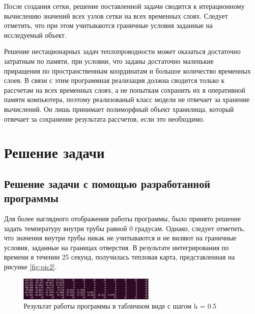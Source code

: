 \documentclass[12pt, a4paper]{article}
\begin{document}
	После создания сетки, решение поставленной задачи сводится к итерационному вычислению значений всех узлов сетки на всех временных слоях. Следует отметить, что при этом учитываются граничные условия заданные на исследуемый объект.
	
	Решение нестационарных задач теплопроводности может оказаться достаточно затратным по памяти, при условии, что заданы достаточно маленькие приращения по пространственным координатам и большое количество временных слоев. В связи с этим программная реализация должна сводится только к рассчетам на всех временных слоях, а не попыткам сохранить их в оперативной памяти компьютера, поэтому реализованый класс модели не отвечает за хранение вычислений. Он лишь принимает полиморфный объект хранилища, который отвечает за сохранение результата рассчетов, если это необходимо.
	
	\section{Решение задачи}
	\subsection{Решение задачи с помощью разработанной программы}
	
	Для более наглядного отображения работы программы, было принято решение задать температуру внутри трубы равной 0 градусам. Однако, следует отметить, что значения внутри трубы никак не учитываются и не виляют на граничные условия, заданные на границах отверстия. В результате интегрирования по времени в течении 25 секунд, получилась тепловая карта, представленная на рисунке \ref{fig:pic2}. 
	
	\begin{figure}[h]
		\centering    %
		\includegraphics[width=0.6\textwidth]{static/TableResult.png}
		\caption{Результат работы программы в табличном виде с шагом h = 0.5} %
		\label{fig:pic3} %
	\end{figure}
	
\end{document}
